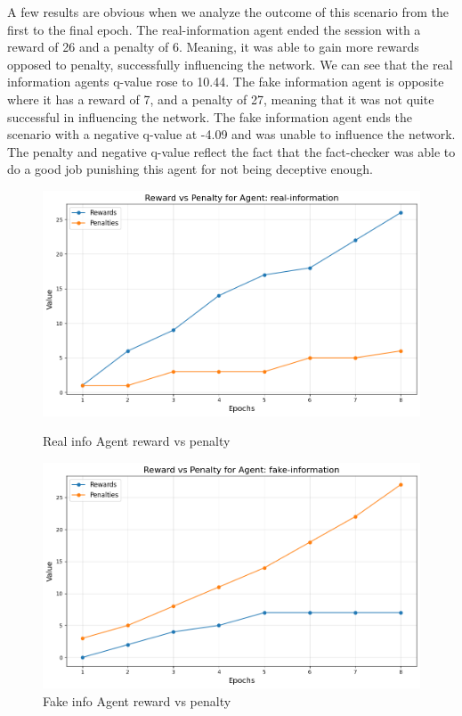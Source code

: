 \documentclass[twoside]{article}
\begin{document}
A few results are obvious when we analyze the outcome of this scenario from the first to the final epoch. The real-information agent ended the session with a reward of 26 and a penalty of 6. Meaning, it was able to gain more rewards opposed to penalty, successfully influencing the network. We can see that the real information agents q-value rose to 10.44. The fake information agent is opposite where it has a reward of 7, and a penalty of 27, meaning that it was not quite successful in influencing the network. The fake information agent ends the scenario with a negative q-value at -4.09 and was unable to influence the network. The penalty and negative q-value reflect the fact that the fact-checker was able to do a good job punishing this agent for not being deceptive enough. 

\begin{figure}[htbp]
     \centering
     \begin{minipage}[b]{0.45\textwidth}
         \centering
         \includegraphics[width=\textwidth]{../results/images/real_info_rp.png}
         \caption{Real info Agent reward vs penalty}
         \label{fig:image1}
     \end{minipage}
     \hfill
     \begin{minipage}[b]{0.45\textwidth}
         \centering
         \includegraphics[width=\textwidth]{../results/images/fake_info_rp.png}
         \caption{Fake info Agent reward vs penalty}
         \label{fig:image2}
     \end{minipage}
 \end{figure}
 
\end{document}
